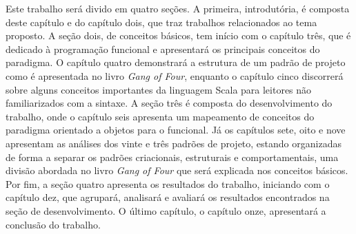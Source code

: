
Este trabalho será divido em quatro seções. 
A primeira, introdutória, é composta deste capítulo 
e do capítulo dois, que traz trabalhos relacionados 
ao tema proposto. A seção dois, de conceitos 
básicos, tem início com o capítulo três, que é dedicado 
à programação funcional e apresentará os principais 
conceitos do paradigma. O capítulo quatro demonstrará a 
estrutura de um padrão de projeto como é apresentada 
no livro \textit{Gang of Four}, enquanto o capítulo 
cinco discorrerá sobre alguns conceitos importantes 
da linguagem Scala para leitores não familiarizados 
com a sintaxe. A seção três é composta do desenvolvimento 
do trabalho, onde o capítulo seis apresenta um 
mapeamento de conceitos do paradigma orientado a 
objetos para o funcional. Já os capítulos sete, 
oito e nove apresentam as análises dos vinte e 
três padrões de projeto, estando organizadas 
de forma a separar os padrões criacionais, 
estruturais e comportamentais, uma divisão 
abordada no livro \textit{Gang of Four} que será 
explicada nos conceitos básicos. Por fim, 
a seção quatro apresenta os resultados do 
trabalho, iniciando com o capítulo dez, 
que agrupará, analisará e avaliará os 
resultados encontrados na seção de 
desenvolvimento. O último capítulo, 
o capítulo onze, apresentará a conclusão 
do trabalho.